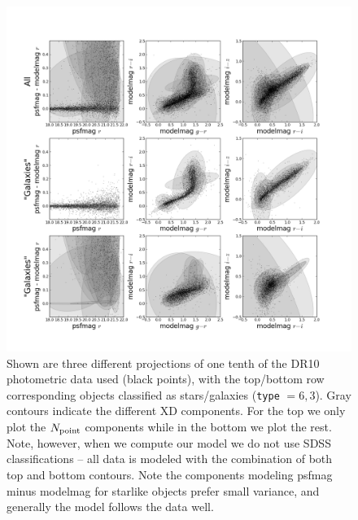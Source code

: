 \documentclass[12pt,preprint]{aastex}
\newcommand\ttt[1]{{\texttt{#1}}}
\begin{document}
\begin{figure}
\centering
\includegraphics[clip=true, trim=1.5cm 0.5cm 1.5cm 0.5cm,
  width=16cm]{fig1.png}
\caption{Shown are three different projections of one tenth of the DR10
photometric data used (black points), with the top/bottom row corresponding
objects classified as stars/galaxies (\ttt{type} $=6, 3$).  Gray contours
indicate the different XD components.  For the top we only plot the
$N_{\rm point}$ components while in the bottom we plot the rest.  Note,
however, when we compute our model we do not use SDSS classifications -- all
data is modeled with the combination of both top and bottom contours.  Note
the components modeling psfmag minus modelmag for starlike objects prefer
small variance, and generally the model follows the data well.
}
\label{fig:contours}
\end{figure}
\end{document}
